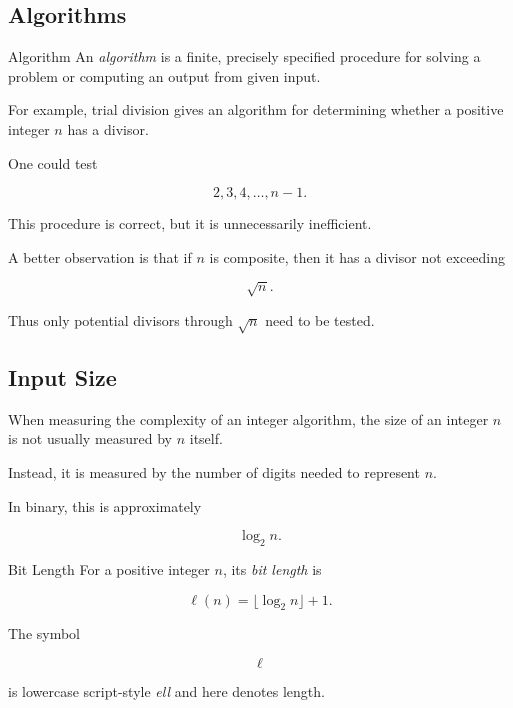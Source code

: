 \subsection{Algorithms}
\label{subsec:number-theoretic-algorithms}

\begin{definitionbox}{Algorithm}
An \emph{algorithm} is a finite, precisely specified procedure for solving a
problem or computing an output from given input.
\end{definitionbox}

For example, trial division gives an algorithm for determining whether a
positive integer \(n\) has a divisor.

One could test

\[ 2,3,4,\ldots,n-1. \]

This procedure is correct, but it is unnecessarily inefficient.

A better observation is that if \(n\) is composite, then it has a divisor
not exceeding

\[ \sqrt n. \]

Thus only potential divisors through \(\sqrt n\) need to be tested.

\subsection{Input Size}
\label{subsec:integer-input-size}

When measuring the complexity of an integer algorithm, the size of an integer
\(n\) is not usually measured by \(n\) itself.

Instead, it is measured by the number of digits needed to represent \(n\).

In binary, this is approximately

\[ \log_2 n. \]

\begin{definitionbox}{Bit Length}
For a positive integer \(n\), its \emph{bit length} is

\[ \ell(n)=\lfloor\log_2 n\rfloor+1. \]
\end{definitionbox}

The symbol

\[ \ell \]

is lowercase script-style \emph{ell} and here denotes length.

